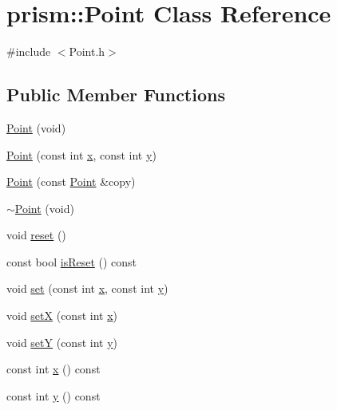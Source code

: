 \hypertarget{classprism_1_1_point}{}\section{prism\+:\+:Point Class Reference}
\label{classprism_1_1_point}


{\ttfamily \#include $<$Point.\+h$>$}

\subsection*{Public Member Functions}
\begin{DoxyCompactItemize}
\item 
\hyperlink{classprism_1_1_point_a505a19bd681a9e195f8bf9dbd3c445c7}{Point} (void)
\item 
\hyperlink{classprism_1_1_point_a93bfdd8fa48253786030802190577129}{Point} (const int \hyperlink{classprism_1_1_point_a725d8721ccf4e59ce9a912490e9487f9}{x}, const int \hyperlink{classprism_1_1_point_ac3283efaa56d37b9d69b7ff5e9d5c2f4}{y})
\item 
\hyperlink{classprism_1_1_point_af09a25c46be47b8c4566b15ddac632b0}{Point} (const \hyperlink{classprism_1_1_point}{Point} \&copy)
\item 
\hyperlink{classprism_1_1_point_a948aa05b80053c019bf963315a2cea8a}{$\sim$\+Point} (void)
\item 
void \hyperlink{classprism_1_1_point_abda32c4f2e16a5a3276949732992f911}{reset} ()
\item 
const bool \hyperlink{classprism_1_1_point_a426d00c2d9d582723ed69e1a73034641}{is\+Reset} () const 
\item 
void \hyperlink{classprism_1_1_point_ac327d98f8dfc1768a6aae63a144cf2fd}{set} (const int \hyperlink{classprism_1_1_point_a725d8721ccf4e59ce9a912490e9487f9}{x}, const int \hyperlink{classprism_1_1_point_ac3283efaa56d37b9d69b7ff5e9d5c2f4}{y})
\item 
void \hyperlink{classprism_1_1_point_a39aac064dac78373b3be254ab2bc6ab4}{setX} (const int \hyperlink{classprism_1_1_point_a725d8721ccf4e59ce9a912490e9487f9}{x})
\item 
void \hyperlink{classprism_1_1_point_afc2fc43295a911175d7e709b80dc2068}{setY} (const int \hyperlink{classprism_1_1_point_ac3283efaa56d37b9d69b7ff5e9d5c2f4}{y})
\item 
const int \hyperlink{classprism_1_1_point_a725d8721ccf4e59ce9a912490e9487f9}{x} () const 
\item 
const int \hyperlink{classprism_1_1_point_ac3283efaa56d37b9d69b7ff5e9d5c2f4}{y} () const 

\end{DoxyCompactItemize}
